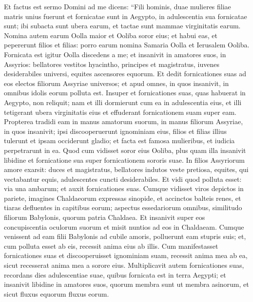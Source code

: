 \begin{biblechapter}  
\verse Et factus est sermo Domini ad me dicens: 
\verse “Fili hominis, duae mulieres filiae matris unius fuerunt 
\verse et fornicatae sunt in Aegypto, in adulescentia sua fornicatae sunt; ibi subacta sunt ubera earum, et tactae sunt mammae virginitatis earum. 
\verse Nomina autem earum Oolla maior et Ooliba soror eius; et habui eas, et pepererunt filios et filias: porro earum nomina Samaria Oolla et Ierusalem Ooliba. 
\verse Fornicata est igitur Oolla discedens a me; et insanivit in amatores suos, in Assyrios: bellatores 
\verse vestitos hyacintho, principes et magistratus, iuvenes desiderabiles universi, equites ascensores equorum. 
\verse Et dedit fornicationes suas ad eos electos filiorum Assyriae universos; et apud omnes, in quos insanivit, in omnibus idolis eorum polluta est. 
\verse Insuper et fornicationes suas, quas habuerat in Aegypto, non reliquit; nam et illi dormierunt cum ea in adulescentia eius, et illi tetigerant ubera virginitatis eius et effuderant fornicationem suam super eam. 
\verse Propterea tradidi eam in manus amatorum suorum, in manus filiorum Assyriae, in quos insanivit; 
\verse ipsi discooperuerunt ignominiam eius, filios et filias illius tulerunt et ipsam occiderunt gladio; et facta est famosa mulieribus, et iudicia perpetrarunt in ea. 
\verse Quod cum vidisset soror eius Ooliba, plus quam illa insanivit libidine et fornicatione sua super fornicationem sororis suae. 
\verse In filios Assyriorum amore exarsit: duces et magistratus, bellatores indutos veste pretiosa, equites, qui vectabantur equis, adulescentes cuncti desiderabiles. 
\verse Et vidi quod polluta esset: via una ambarum; 
\verse et auxit fornicationes suas. Cumque vidisset viros depictos in pariete, imagines Chaldaeorum expressas sinopide,  
\verse et accinctos balteis renes, et tiaras defluentes in capitibus eorum; aspectus essedariorum omnibus, similitudo filiorum Babylonis, quorum patria Chaldaea.  
\verse Et insanivit super eos concupiscentia oculorum suorum et misit nuntios ad eos in Chaldaeam. 
\verse Cumque venissent ad eam filii Babylonis ad cubile amoris, polluerunt eam stupris suis; et, cum polluta esset ab eis, recessit anima eius ab illis. 
\verse Cum manifestasset fornicationes suas et discooperuisset ignominiam suam, recessit anima mea ab ea, sicut recesserat anima mea a sorore eius. 
\verse Multiplicavit autem fornicationes suas, recordans dies adulescentiae suae, quibus fornicata est in terra Aegypti; 
\verse et insanivit libidine in amatores suos, quorum membra sunt ut membra asinorum, et sicut fluxus equorum fluxus eorum. 

\end{biblechapter}
